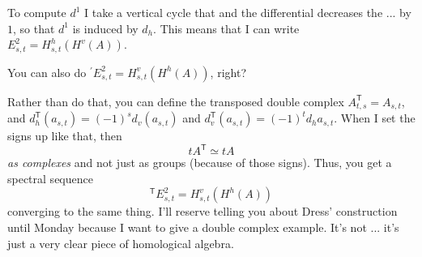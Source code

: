 To compute $d^1$ I take a vertical cycle that and the differential decreases the ... by $1$, so that $d^1$ is induced by $d_h$.
This means that I can write $E^2_{s,t} = H^h_{s,t}(H^v(A))$.
\begin{question}
    You can also do $^\prime E^2_{s,t} = H^v_{s,t}(H^h(A))$, right?
\end{question}
Rather than do that, you can define the transposed double complex $A^\mathsf{T}_{t,s} = A_{s,t}$, and $d^\mathsf{T}_h(a_{s,t}) = (-1)^s d_v(a_{s,t})$ and $d^\mathsf{T}_v(a_{s,t}) = (-1)^t d_h a_{s,t}$.
When I set the signs up like that, then
$$
tA^\mathsf{T} \simeq tA
$$
\emph{as complexes} and not just as groups (because of those signs).
Thus, you get a spectral sequence
$$
^\mathsf{T}E^2_{s,t} = H^v_{s,t}(H^h(A))
$$
converging to the same thing.
I'll reserve telling you about Dress' construction until Monday because I want to give a double complex example.
It's not ... it's just a very clear piece of homological algebra.
